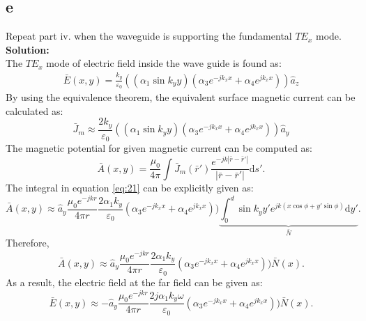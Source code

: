 \documentclass[11pt]{amsart}
\begin{document}
\subsection*{e}
Repeat part iv. when the waveguide is supporting the fundamental $TE_x$ mode.
\\
\textbf{Solution:}\\
The $TE_x$ mode of electric field inside the wave guide is found as:
\begin{equation}
\label{eq:20}
\begin{split}
\bar{E}(x,y)= \frac{k_y}{\varepsilon_0}((\alpha_1 \sin k_y y)(\alpha_3 e^{-j k_x x}+\alpha_4 e^{j k_x x}))\hat{a}_z
\end{split}
\end{equation}
By using the equivalence theorem, the equivalent surface magnetic current can be calculated as:
\begin{equation}
\bar{J}_m \approx \frac{2 k_y}{\varepsilon_0}((\alpha_1 \sin k_y y)(\alpha_3 e^{-j k_x x}+\alpha_4 e^{j k_x x}))\hat{a}_y
\end{equation}
The magnetic potential for given magnetic current can be computed as:
\begin{equation}
\label{eq:21}
\bar{A}(x,y)=\frac{\mu_0}{4 \pi}\int \bar{J}_m(\bar{r}') \frac{e^{-jk\left | \bar{r}-\bar{r}' \right |}}{\left | \bar{r}-\bar{r}' \right |}\mathrm{d} s'.
\end{equation}
The integral in equation \ref{eq:21} can be explicitly given as:
\begin{equation}
\label{eq:22}
\bar{A}(x,y) \approx \hat{a}_y \frac{\mu_0 e^{-jkr}}{4 \pi r}\frac{2 \alpha_1 k_y}{\varepsilon_0}(\alpha_3 e^{-j k_x x}+\alpha_4 e^{j k_x x})) \underbrace{\int_{0}^{d} \sin k_y y' e^{jk (x\cos \phi+y'\sin \phi)}\mathrm{d} y'}_{\bar{N}}.
\end{equation}
Therefore,
\begin{equation}
\bar{A}(x,y) \approx \hat{a}_y \frac{\mu_0 e^{-jkr}}{4 \pi r}\frac{2 \alpha_1 k_y}{\varepsilon_0}(\alpha_3 e^{-j k_x x}+\alpha_4 e^{j k_x x}))\bar{N}(x).
\end{equation}
As a result, the electric field at the far field can be given as:
\begin{equation}
\bar{E}(x,y) \approx -\hat{a}_y \frac{\mu_0 e^{-jkr}}{4 \pi r}\frac{2 j \alpha_1 k_y \omega}{\varepsilon_0}(\alpha_3 e^{-j k_x x}+\alpha_4 e^{j k_x x}))\bar{N}(x).
\end{equation}
\end{document}
